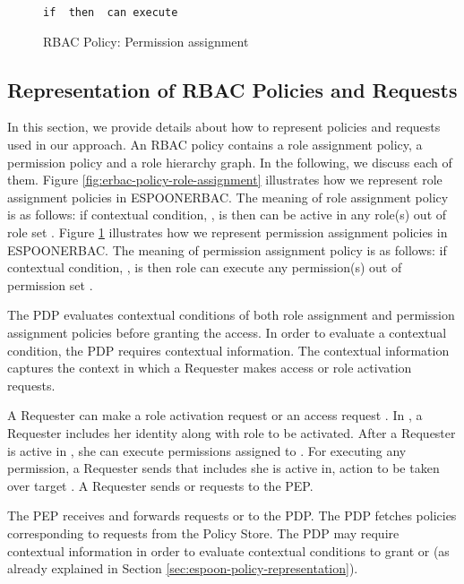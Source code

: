 \documentclass[epsfig,a4paper,11pt,titlepage]{book}
\numberwithin{algorithm}{chapter}
\newcommand{\Keywords}{\lstset{keywords={if,then,can,be,active,in,execute}}}
\begin{document}
\begin{figure} [htp]
\Keywords
\begin{lstlisting}[style=AMMA,numbers=none,breaklines,mathescape,rulesepcolor=\color{black}]
if  then  can execute 

\end{lstlisting}
\caption[RBAC Policy: Permission assignment]{\gls{RBAC} Policy: Permission assignment}
\label{fig:erbac-policy-permission-assignment}
\end{figure}

\subsection[Representation of RBAC Policies and Requests]{Representation of \gls{RBAC} Policies and Requests}
\label{sec:representation}
In this section, we provide details about how to represent policies and requests used in our approach. An \gls{RBAC} policy contains a role assignment policy, a permission policy and a role hierarchy graph. In the following, we discuss each of them. Figure \ref{fig:erbac-policy-role-assignment} illustrates how we represent role assignment policies in \gls{ESPOONERBAC}. The meaning of role assignment policy is as follows: if contextual condition, , is  then  can be active in any role(s) out of role set . Figure \ref{fig:erbac-policy-permission-assignment} illustrates how we represent permission assignment policies in \gls{ESPOONERBAC}. The meaning of permission assignment policy is as follows: if contextual condition, , is  then role  can execute any permission(s) out of permission set .

The \gls{PDP} evaluates contextual conditions of both role assignment and permission assignment policies before granting the access. In order to evaluate a contextual condition, the \gls{PDP} requires contextual information. The contextual information captures the context in which a Requester makes access or role activation requests.

A Requester can make a role activation request  or an access request . In , a Requester includes her identity  along with role  to be activated. After a Requester is active in , she can execute permissions assigned to . For executing any permission, a Requester sends  that includes  she is active in, action  to be taken over target . A Requester sends  or  requests to the \gls{PEP}. 

The \gls{PEP} receives and forwards requests  or  to the \gls{PDP}. The \gls{PDP} fetches policies corresponding to requests from the Policy Store. The \gls{PDP} may require contextual information in order to evaluate contextual conditions to grant  or  (as already explained in Section \ref{sec:espoon-policy-representation}).
\end{document}
